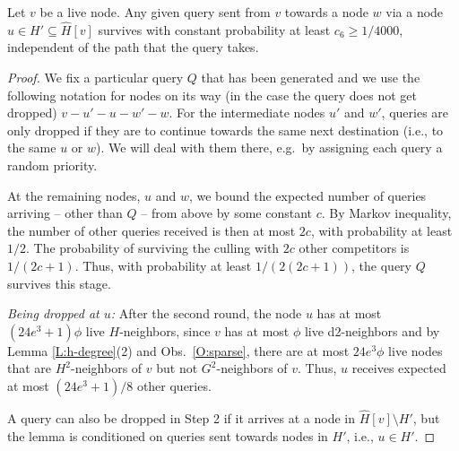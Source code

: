 \begin{lemma} Let $v$ be a live node. 
Any given query sent from $v$ towards a node $w$ via a node $u\in H'\subseteq \hat{H}[v]$ survives with constant probability at least $c_6 \ge 1/4000$, independent of the path that the query takes.
\label{L:survival}
\end{lemma}
\begin{proof}
We fix a particular query $Q$ that has been generated and we use the following notation for nodes on its way (in the case the query does not get dropped) $v-u'-u-w'-w$.
For the intermediate nodes $u'$ and $w'$, queries are only dropped if they are to continue towards the same next destination (i.e., to the same $u$ or $w$). We will deal with them there, e.g.\ by assigning each query a random priority.

At the remaining nodes, $u$ and $w$, we bound the expected number of queries arriving -- other than $Q$ -- from above by some constant $c$. By Markov inequality, the number of other queries received is then at most $2c$, with probability at least $1/2$. The probability of surviving the culling with $2c$ other competitors is $1/(2c+1)$. 
Thus, with probability at least $1/(2(2c+1))$, the query $Q$ survives this stage.


\textit{Being dropped at $u$:} After the second round, the node $u$ has at most $(24e^3+1)\phi$ live $H$-neighbors, since $v$ has at most $\phi$ live d2-neighbors and by Lemma \ref{L:h-degree}(2) and Obs.~\ref{O:sparse}, 
there are at most $24e^3\phi$ live nodes that are $H^2$-neighbors of $v$ but not $G^2$-neighbors of $v$. 
Thus, $u$ receives expected at most $(24e^3+1)/8$ other queries.

A query can also be dropped in Step 2 if it arrives at a node in $\hat{H}[v] \setminus H'$, but the lemma is conditioned on queries sent towards nodes in $H'$, i.e., $u\in H'$. 


\end{proof}
